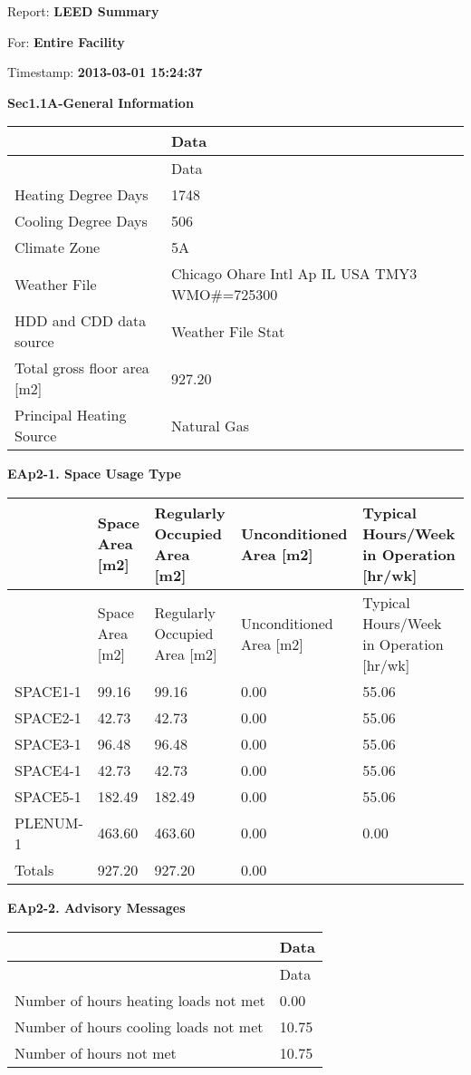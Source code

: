 Report: \textbf{LEED Summary}

For: \textbf{Entire Facility}

Timestamp: \textbf{2013-03-01 15:24:37}

\textbf{Sec1.1A-General Information}

\begin{longtable}[c]{>{\raggedright}p{2.21in}>{\raggedright}p{3.78in}}
\toprule 
 & Data \tabularnewline
\midrule
\endfirsthead

\toprule 
 & Data \tabularnewline
\midrule
\endhead

Heating Degree Days & 1748 \tabularnewline
Cooling Degree Days & 506 \tabularnewline
Climate Zone & 5A \tabularnewline
Weather File & Chicago Ohare Intl Ap IL USA TMY3 WMO\#=725300 \tabularnewline
HDD and CDD data source & Weather File Stat \tabularnewline
Total gross floor area [m2] & 927.20 \tabularnewline
Principal Heating Source & Natural Gas \tabularnewline
\bottomrule
\end{longtable}

\textbf{EAp2-1. Space Usage Type}

\begin{longtable}[c]{>{\raggedright}p{1.2in}>{\raggedright}p{1.2in}>{\raggedright}p{1.2in}>{\raggedright}p{1.2in}>{\raggedright}p{1.2in}}
\toprule 
 & Space Area [m2] & Regularly Occupied Area [m2] & Unconditioned Area [m2] & Typical Hours/Week in Operation [hr/wk] \tabularnewline
\midrule
\endfirsthead

\toprule 
 & Space Area [m2] & Regularly Occupied Area [m2] & Unconditioned Area [m2] & Typical Hours/Week in Operation [hr/wk] \tabularnewline
\midrule
\endhead

SPACE1-1 & 99.16 & 99.16 & 0.00 & 55.06 \tabularnewline
SPACE2-1 & 42.73 & 42.73 & 0.00 & 55.06 \tabularnewline
SPACE3-1 & 96.48 & 96.48 & 0.00 & 55.06 \tabularnewline
SPACE4-1 & 42.73 & 42.73 & 0.00 & 55.06 \tabularnewline
SPACE5-1 & 182.49 & 182.49 & 0.00 & 55.06 \tabularnewline
PLENUM-1 & 463.60 & 463.60 & 0.00 & 0.00 \tabularnewline
Totals & 927.20 & 927.20 & 0.00 & ~ \tabularnewline
\bottomrule
\end{longtable}

\textbf{EAp2-2. Advisory Messages}

\begin{longtable}[c]{@{}ll@{}}
\toprule 
 & Data \tabularnewline
\midrule
\endfirsthead

\toprule 
 & Data \tabularnewline
\midrule
\endhead

Number of hours heating loads not met & 0.00 \tabularnewline
Number of hours cooling loads not met & 10.75 \tabularnewline
Number of hours not met & 10.75 \tabularnewline
\bottomrule
\end{longtable}

